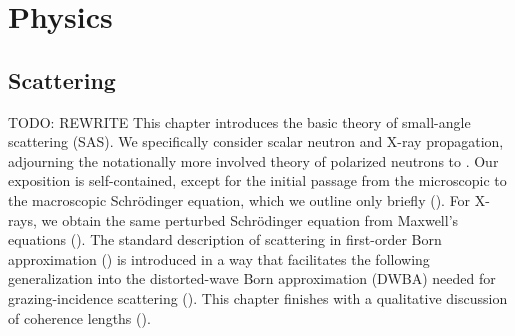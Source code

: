 
\def\Do{\overset{o}{D}}
\def\Go{\overset{o}{G}}
\def\TD{\TENS{D}}
\def\Td{\TENS{\delta}}
\def\TG{\TENS{G}}
\def\TU{\TENS{U}}
\def\TL{\TENS{\Lambda}}
\def\TDo{\TENS{\overset{o}{D}}}
\def\TGo{\TENS{\overset{o}{G}}}
\def\Psio{\v{\overset{o}{\Psi}}}
\def\ue{\v{\hat u}}

\def\pfo{\overset{o}{\psi}_\sf}
\def\pfoc{\overset{o}{\psi}\vphantom{\psi}^*_\sf}

%
%

\part{Physics}\label{PPHYS}

\chapter{Scattering}  \label{SSca}

TODO: REWRITE
This chapter introduces the basic theory of small-angle scattering (SAS).
%
%
We specifically consider scalar neutron and X-ray propagation,
adjourning the notationally more involved
theory of polarized neutrons to .
Our exposition is self-contained,
except for the initial passage from the microscopic
to the macroscopic Schrödinger equation,
which we outline only briefly ().
For X-rays, we obtain the same perturbed Schrödinger equation from Maxwell's equations
().
The standard description of scattering in first-order Born approximation
()
is introduced in a way that facilitates the following generalization
into the distorted-wave Born approximation (DWBA)
needed for grazing-incidence scattering ().
This chapter finishes with a qualitative discussion
of coherence lengths ().

